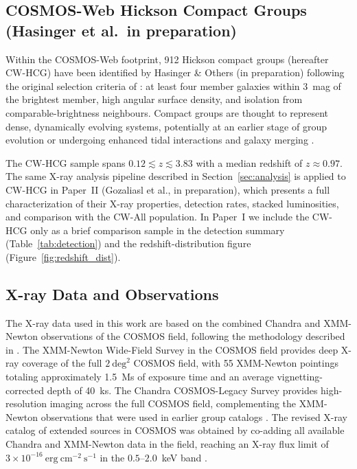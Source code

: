 \documentclass{aa}
\begin{document}
\subsection{COSMOS-Web Hickson Compact Groups (Hasinger et al.\ in preparation)}

Within the COSMOS-Web footprint, 912 Hickson compact groups (hereafter CW-HCG) have been identified by Hasinger \& Others (in preparation) following the original selection criteria of \citet{Hickson1982}: at least four member galaxies within 3~mag of the brightest member, high angular surface density, and isolation from comparable-brightness neighbours. Compact groups are thought to represent dense, dynamically evolving systems, potentially at an earlier stage of group evolution or undergoing enhanced tidal interactions and galaxy merging \citep{MendesDeOliveira1994}.

The CW-HCG sample spans $0.12 \lesssim z \lesssim 3.83$ with a median redshift of $z \approx 0.97$. The same X-ray analysis pipeline described in Section~\ref{sec:analysis} is applied to CW-HCG in Paper~II (Gozaliasl et al., in preparation), which presents a full characterization of their X-ray properties, detection rates, stacked luminosities, and comparison with the CW-All population. In Paper~I we include the CW-HCG only as a brief comparison sample in the detection summary (Table~\ref{tab:detection}) and the redshift-distribution figure (Figure~\ref{fig:redshift_dist}).

\subsection{X-ray Data and Observations}

The X-ray data used in this work are based on the combined Chandra and XMM-Newton observations of the COSMOS field, following the methodology described in \citet{Gozaliasl2019}. The XMM-Newton Wide-Field Survey in the COSMOS field \citep{Hasinger2007} provides deep X-ray coverage of the full $2~\mathrm{deg}^2$ COSMOS field, with 55 XMM-Newton pointings totaling approximately 1.5~Ms of exposure time and an average vignetting-corrected depth of 40~ks. The Chandra COSMOS-Legacy Survey \citep{Elvis2009,Civano2016,Marchesi2016} provides high-resolution imaging across the full COSMOS field, complementing the XMM-Newton observations that were used in earlier group catalogs \citep{Finoguenov2007,George2011}. The revised X-ray catalog of extended sources in COSMOS was obtained by co-adding all available Chandra and XMM-Newton data in the field, reaching an X-ray flux limit of $3 \times 10^{-16}~\mathrm{erg~cm^{-2}~s^{-1}}$ in the $0.5$--$2.0$~keV band \citep{Gozaliasl2019}.
\end{document}
